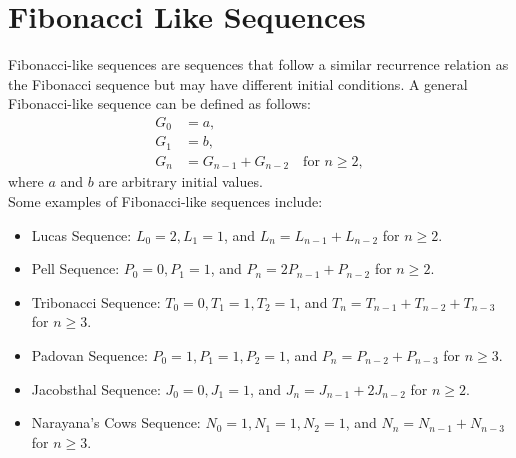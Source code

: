 \documentclass[openany]{book}
\begin{document}
\section{Fibonacci Like Sequences}
Fibonacci-like sequences are sequences that follow a similar recurrence relation as the Fibonacci sequence but may have different initial conditions. A general Fibonacci-like sequence can be defined as follows:
\begin{align*}
    G_0 &= a, \\
    G_1 &= b, \\
    G_n &= G_{n-1} + G_{n-2} \quad \text{for } n \geq 2,
\end{align*}
where $a$ and $b$ are arbitrary initial values. \\
Some examples of Fibonacci-like sequences include:
\begin{itemize}
    \item Lucas Sequence: $L_0 = 2, L_1 = 1$, and $L_n = L_{n-1} + L_{n-2}$ for $n \geq 2$.
    \item Pell Sequence: $P_0 = 0, P_1 = 1$, and $P_n = 2P_{n-1} + P_{n-2}$ for $n \geq 2$.
    \item Tribonacci Sequence: $T_0 = 0, T_1 = 1, T_2 = 1$, and $T_n = T_{n-1} + T_{n-2} + T_{n-3}$ for $n \geq 3$.
    \item Padovan Sequence: $P_0 = 1, P_1 = 1, P_2 = 1$, and $P_n = P_{n-2} + P_{n-3}$ for $n \geq 3$.
    \item Jacobsthal Sequence: $J_0 = 0, J_1 = 1$, and $J_n = J_{n-1} + 2J_{n-2}$ for $n \geq 2$.
    \item Narayana's Cows Sequence: $N_0 = 1, N_1 = 1, N_2 = 1$, and $N_n = N_{n-1} + N_{n-3}$ for $n \geq 3$.
\end{itemize}
\end{document}
